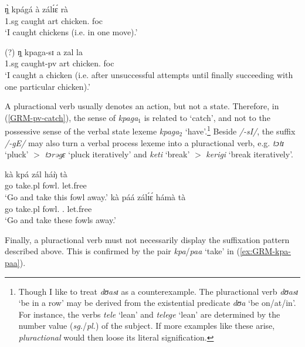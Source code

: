 \begin{exe}
\begin{exe}
\begin{exe}
{\begin{exe}
\begin{exe}
\begin{exe}
\begin{exe}
\begin{exe}
\begin{exe}
\begin{exe}
\begin{xlist}
\begin{exe}
\begin{exe}
\begin{exe}
\begin{exe}
\begin{exe}
\begin{exe}
\begin{exe}
\begin{exe}
\begin{exe}
\begin{exe}
\begin{exe}
\begin{exe}
\begin{exe}
\begin{exe}
\begin{exe}
 \ex\label{GRM-pv-catchpl2}
\gll   ŋ̩̀     kpágá  à  zálɪ́ɛ́ rà   \\
       {\sc 1.sg}  {caught} {\sc art} {chicken.\pl} {\sc foc}\\
\glt `I caught chickens (i.e. in one move).'


 \ex\label{GRM-pv-catchout}
\gll (?)     ŋ̩  kpaga-sɪ  a  zal  la  \\
     {}   {\sc 1.sg}  {caught-{\sc pv}} {\sc art} {chicken.\sg} {\sc foc}\\
\glt `I caught a chicken (i.e. after unsuccessful attempts until finally
succeeding with
one particular chicken).'

 
\z 
 \z


A pluractional verb usually denotes an action, but not a state. Therefore, in
(\ref{GRM-pv-catch}), the sense of {\it kpaga}$_{1}$  is related to `catch', 
and 
not
to the  possessive sense of the verbal state lexeme   {\it kpaga}$_{2}$
`have'.\footnote{Though I like to treat {\it dʊasɪ} as a counterexample.  The
pluractional verb {\it dʊasɪ} `be in a row'  may be  derived from the 
existential
predicate {\it dʊa} `be on/at/in'.  For instance, the verbs {\it tele} `lean'   
and {\it telege} `lean' are determined 
by
the number value ({\it sg.}/{\it  pl.})  of the subject.  If more examples like
these  arise, {\it pluractional} would then loose its literal 
signification.} Beside {\it /-sI/}, the suffix {\it 
/-gE/} may also turn a verbal process lexeme into a pluractional verb, e.g.   
{\it tɔtɪ} `pluck' $>$ {\it  tɔrəgɛ} `pluck iteratively' and  {\it keti} 
`break'  $>$
{\it kerigi} `break iteratively'.

\ea\label{ex:GRM-kpa-paa}
  
    \ea\label{ex:GRM-kpa}
\gll kà kpá zál háŋ̀ tà\\
go take.{\sc pl} fowl.{\sg} {\dem} let.free\\
\glt `Go and take this fowl away.'
      \ex\label{ex:GRM-paa}
\gll kà páá zálɪ́ɛ́ hámà tà\\
go take.{\sc pl} fowl.{\pl} {\dem}.{\pl}  let.free\\
\glt `Go and take these fowls away.'
 
\z 
 \z


Finally, a pluractional verb must not necessarily display the
suffixation pattern
described above. This is confirmed by the pair {\it kpa}/{\it paa} `take'  in
(\ref{ex:GRM-kpa-paa}).





\end{exe}
\end{exe}
\end{exe}
\end{exe}
\end{exe}
\end{exe}
\end{exe}
\end{exe}
\end{exe}
\end{exe}
\end{exe}
\end{exe}
\end{exe}
\end{exe}
\end{exe}
\end{xlist}
\end{exe}
\end{exe}
\end{exe}
\end{exe}
\end{exe}
\end{exe}
\end{exe}}
\end{exe}
\end{exe}
\end{exe}
